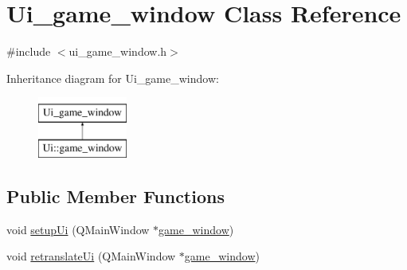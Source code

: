 \hypertarget{classUi__game__window}{\section{Ui\-\_\-game\-\_\-window Class Reference}
\label{classUi__game__window}
}


{\ttfamily \#include $<$ui\-\_\-game\-\_\-window.\-h$>$}

Inheritance diagram for Ui\-\_\-game\-\_\-window\-:\begin{figure}[H]
\begin{center}
\leavevmode
\includegraphics[height=2.000000cm]{classUi__game__window}
\end{center}
\end{figure}
\subsection*{Public Member Functions}
\begin{DoxyCompactItemize}
\item 
void \hyperlink{classUi__game__window_a3a7824fa0cac2ee95145c841c6615143}{setup\-Ui} (Q\-Main\-Window $\ast$\hyperlink{classgame__window}{game\-\_\-window})
\item 
void \hyperlink{classUi__game__window_af8b0343e4a4202b03c2a2038455c508a}{retranslate\-Ui} (Q\-Main\-Window $\ast$\hyperlink{classgame__window}{game\-\_\-window})
\end{DoxyCompactItemize}
